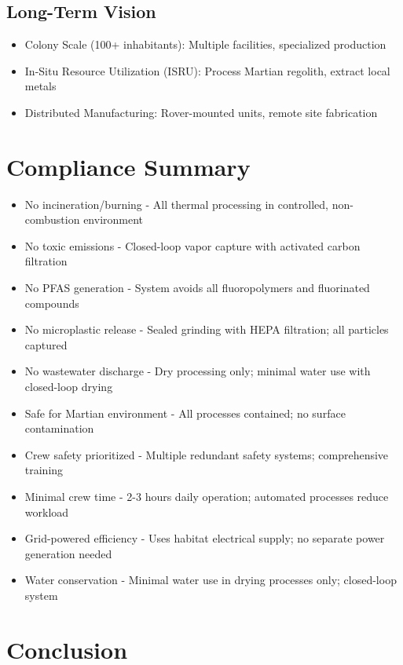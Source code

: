 \documentclass[12pt, a4paper]{article}
\begin{document}
\subsection{Long-Term Vision}
\begin{itemize}
    \item Colony Scale (100+ inhabitants): Multiple facilities, specialized production
    \item In-Situ Resource Utilization (ISRU): Process Martian regolith, extract local metals
    \item Distributed Manufacturing: Rover-mounted units, remote site fabrication
\end{itemize}

\section{Compliance Summary}

\begin{itemize}
    \item No incineration/burning - All thermal processing in controlled, non-combustion environment
    \item No toxic emissions - Closed-loop vapor capture with activated carbon filtration
    \item No PFAS generation - System avoids all fluoropolymers and fluorinated compounds
    \item No microplastic release - Sealed grinding with HEPA filtration; all particles captured
    \item No wastewater discharge - Dry processing only; minimal water use with closed-loop drying
    \item Safe for Martian environment - All processes contained; no surface contamination
    \item Crew safety prioritized - Multiple redundant safety systems; comprehensive training
    \item Minimal crew time - 2-3 hours daily operation; automated processes reduce workload
    \item Grid-powered efficiency - Uses habitat electrical supply; no separate power generation needed
    \item Water conservation - Minimal water use in drying processes only; closed-loop system
\end{itemize}

\section{Conclusion}
\end{document}

